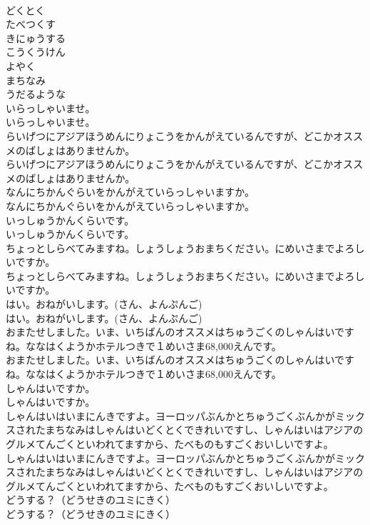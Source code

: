 \documentclass[8pt]{extreport}
\begin{document}
\begin{CJK}{UTF8}{min}
\\	どくとく
\\	たべつくす
\\	きにゅうする
\\	こうくうけん
\\	よやく
\\	まちなみ
\\	うだるような
\\	いらっしゃいませ。
\\	いらっしゃいませ。
\\	らいげつにアジアほうめんにりょこうをかんがえているんですが、どこかオススメのばしょはありませんか。
\\	らいげつにアジアほうめんにりょこうをかんがえているんですが、どこかオススメのばしょはありませんか。
\\	なんにちかんぐらいをかんがえていらっしゃいますか。
\\	なんにちかんぐらいをかんがえていらっしゃいますか。
\\	いっしゅうかんくらいです。
\\	いっしゅうかんくらいです。
\\	ちょっとしらべてみますね。しょうしょうおまちください。にめいさまでよろしいですか。
\\	ちょっとしらべてみますね。しょうしょうおまちください。にめいさまでよろしいですか。
\\	はい。おねがいします。(さん、よんぷんご)
\\	はい。おねがいします。(さん、よんぷんご)
\\	おまたせしました。いま、いちばんのオススメはちゅうごくのしゃんはいですね。ななはくようかホテルつきで１めいさま68,000えんです。
\\	おまたせしました。いま、いちばんのオススメはちゅうごくのしゃんはいですね。ななはくようかホテルつきで１めいさま68,000えんです。
\\	しゃんはいですか。
\\	しゃんはいですか。
\\	しゃんはいはいまにんきですよ。ヨーロッパぶんかとちゅうごくぶんかがミックスされたまちなみはしゃんはいどくとくできれいですし、しゃんはいはアジアのグルメてんごくといわれてますから、たべものもすごくおいしいですよ。
\\	しゃんはいはいまにんきですよ。ヨーロッパぶんかとちゅうごくぶんかがミックスされたまちなみはしゃんはいどくとくできれいですし、しゃんはいはアジアのグルメてんごくといわれてますから、たべものもすごくおいしいですよ。
\\	どうする？（どうせきのユミにきく）
\\	どうする？（どうせきのユミにきく）

\end{CJK}
\end{document}
